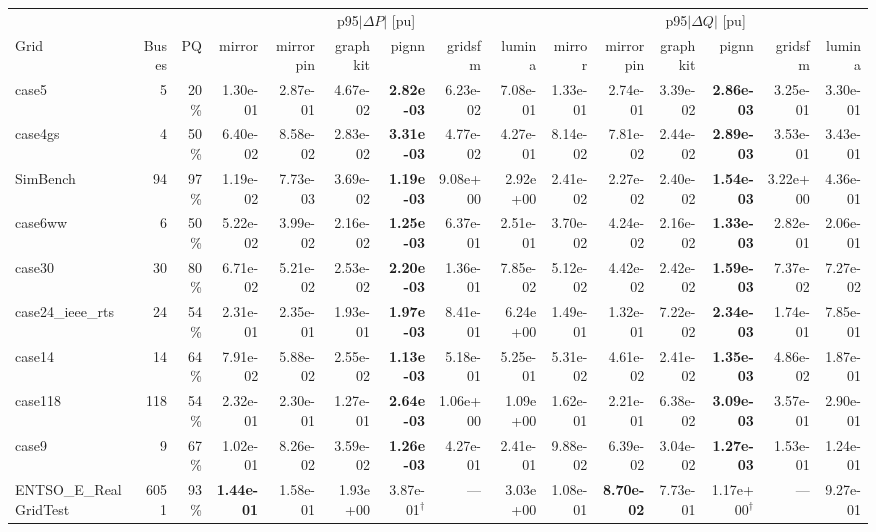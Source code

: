\documentclass[10pt]{article}
\begin{document}
\begin{landscape}
\begin{table}[H]
\centering\scriptsize
\begin{tabular}{lrr rrrrrr rrrrrr}
\toprule
 & & & \multicolumn{6}{c}{p95$|\Delta P|$ [pu]} & \multicolumn{6}{c}{p95$|\Delta Q|$ [pu]} \\
\cmidrule(lr){4-9}\cmidrule(lr){10-15}
Grid & Buses & PQ & mirror & mirrorpin & graphkit & pignn & gridsfm & lumina & mirror & mirrorpin & graphkit & pignn & gridsfm & lumina \\
\midrule
case5 & 5 & 20\% & 1.30e-01 & 2.87e-01 & 4.67e-02 & \textbf{2.82e-03} & 6.23e-02 & 7.08e-01 & 1.33e-01 & 2.74e-01 & 3.39e-02 & \textbf{2.86e-03} & 3.25e-01 & 3.30e-01 \\
case4gs & 4 & 50\% & 6.40e-02 & 8.58e-02 & 2.83e-02 & \textbf{3.31e-03} & 4.77e-02 & 4.27e-01 & 8.14e-02 & 7.81e-02 & 2.44e-02 & \textbf{2.89e-03} & 3.53e-01 & 3.43e-01 \\
SimBench & 94 & 97\% & 1.19e-02 & 7.73e-03 & 3.69e-02 & \textbf{1.19e-03} & 9.08e+00 & 2.92e+00 & 2.41e-02 & 2.27e-02 & 2.40e-02 & \textbf{1.54e-03} & 3.22e+00 & 4.36e-01 \\
case6ww & 6 & 50\% & 5.22e-02 & 3.99e-02 & 2.16e-02 & \textbf{1.25e-03} & 6.37e-01 & 2.51e-01 & 3.70e-02 & 4.24e-02 & 2.16e-02 & \textbf{1.33e-03} & 2.82e-01 & 2.06e-01 \\
case30 & 30 & 80\% & 6.71e-02 & 5.21e-02 & 2.53e-02 & \textbf{2.20e-03} & 1.36e-01 & 7.85e-02 & 5.12e-02 & 4.42e-02 & 2.42e-02 & \textbf{1.59e-03} & 7.37e-02 & 7.27e-02 \\
case24\_ieee\_rts & 24 & 54\% & 2.31e-01 & 2.35e-01 & 1.93e-01 & \textbf{1.97e-03} & 8.41e-01 & 6.24e+00 & 1.49e-01 & 1.32e-01 & 7.22e-02 & \textbf{2.34e-03} & 1.74e-01 & 7.85e-01 \\
case14 & 14 & 64\% & 7.91e-02 & 5.88e-02 & 2.55e-02 & \textbf{1.13e-03} & 5.18e-01 & 5.25e-01 & 5.31e-02 & 4.61e-02 & 2.41e-02 & \textbf{1.35e-03} & 4.86e-02 & 1.87e-01 \\
case118 & 118 & 54\% & 2.32e-01 & 2.30e-01 & 1.27e-01 & \textbf{2.64e-03} & 1.06e+00 & 1.09e+00 & 1.62e-01 & 2.21e-01 & 6.38e-02 & \textbf{3.09e-03} & 3.57e-01 & 2.90e-01 \\
case9 & 9 & 67\% & 1.02e-01 & 8.26e-02 & 3.59e-02 & \textbf{1.26e-03} & 4.27e-01 & 2.41e-01 & 9.88e-02 & 6.39e-02 & 3.04e-02 & \textbf{1.27e-03} & 1.53e-01 & 1.24e-01 \\
ENTSO\_E\_RealGridTest & 6051 & 93\% & \textbf{1.44e-01} & 1.58e-01 & 1.93e+00 & 3.87e-01$^\dagger$ & --- & 3.03e+00 & 1.08e-01 & \textbf{8.70e-02} & 7.73e-01 & 1.17e+00$^\dagger$ & --- & 9.27e-01 \\

\end{tabular}
\end{table}
\end{landscape}
\end{document}
